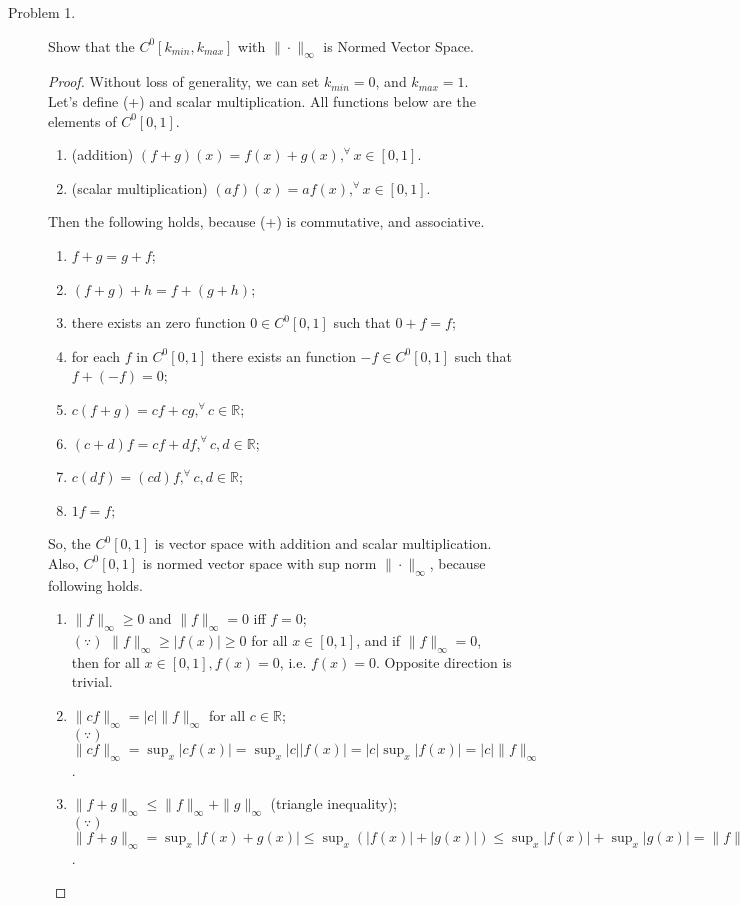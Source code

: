 \documentclass[a4paper, 10pt]{article}
\newcommand{\R}{\mathbb{R}}
\theoremstyle{definition}
\begin{document}
	\begin{description}
	\item[Problem 1.] Show that the $ C^0 [k_{min}, k_{max}]$ with $\|\cdot\|_{\infty}$ is Normed Vector Space. 
 		\begin{proof}

		Without loss of generality, we can set $ k_{min} = 0 $, and $ k_{max} = 1 $.\\
		Let's define (+) and scalar multiplication. All functions below are the elements of $ C^0[0,1]$.

		\begin{enumerate}[]
		\item (addition) $(f+g)(x) = f(x)+g(x), ^{\forall}x \in [0,1]$.
		\item (scalar multiplication) $ (af)(x) = af(x), ^{\forall}x \in [0,1]$.
		\end{enumerate}

		 Then the following holds, because (+) is commutative, and associative.

 		\begin{enumerate}[(1)]
		\item $  f+g = g+f $;
		\item $  (f+g)+h = f+(g+h) $;
		\item there exists an zero function $ 0 \in  C^0 [0, 1]$ such that $ 0 + f = f $;
		\item for each $f$ in $C^0[0,1]$ there exists an function $ -f \in C^0[0,1]$ such that $f+(-f)=0 $;
		\item $c(f+g)=cf+cg, ^\forall c \in \R$;
		\item $(c+d)f = cf + df, ^\forall c,d \in \R$;
		\item $c(df) = (cd)f, ^\forall c,d \in \R$;
		\item $1f = f $;
		\end{enumerate}

		So, the $ C^0[0,1] $ is vector space with addition and scalar multiplication.
		Also, $C^0[0,1] $ is normed vector space with sup norm $\|\cdot \|_{\infty}$, 
		because following holds.

		\begin{enumerate}[(1)]
		\item $\|f\|_\infty \geq 0$ and $\| f \|_\infty = 0$ iff $f=0$;
			\\ $(\because)$  $ \|f\|_\infty \geq |f(x)| \geq 0$ for all $ x \in [0,1] $, and if $\| f \|_\infty=0$, then for all $x \in [0,1], f(x) = 0$, i.e. $f(x)=0$. Opposite direction is trivial.
		\item $\|cf\|_\infty = |c|\| f \|_\infty$ for all $c \in \R$;
			\\ $(\because)$ $\|cf\|_\infty = \sup_x |cf(x)| = \sup_x |c||f(x)| = |c| \sup_x |f(x)| = |c|\|f\|_\infty $.
		\item $\|f+g\|_\infty \leq  \|f\|_\infty + \|g\|_\infty$ (triangle inequality);
			\\ $(\because)$ $\|f+g\|_\infty = \sup_x |f(x) + g(x)| \leq \sup_x (|f(x)| + |g(x)|) \leq \sup_x |f(x)| + \sup_x |g(x)| = \|f\|_\infty + \|g\|_\infty$.
		\end{enumerate}


\end{proof}
\end{description}
\end{document}
